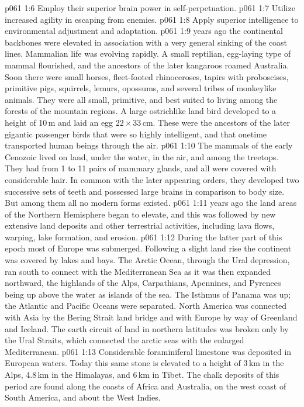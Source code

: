 \vs p061 1:6 \bibnobreakspace Employ their superior brain power in self\hyp{}perpetuation.
\vs p061 1:7 \bibnobreakspace Utilize increased agility in escaping from enemies.
\vs p061 1:8 \bibnobreakspace Apply superior intelligence to environmental adjustment and adaptation.
\vs p061 1:9 \pc {} years ago the continental backbones were elevated in association with a very general sinking of the coast lines. Mammalian life was evolving rapidly. A small reptilian, egg\hyp{}laying type of mammal flourished, and the ancestors of the later kangaroos roamed Australia. Soon there were small horses, fleet\hyp{}footed rhinoceroses, tapirs with proboscises, primitive pigs, squirrels, lemurs, opossums, and several tribes of monkeylike animals. They were all small, primitive, and best suited to living among the forests of the mountain regions. A large ostrichlike land bird developed to a height of 10\,m and laid an egg $22\times 33$\,cm. These were the ancestors of the later gigantic passenger birds that were so highly intelligent, and that onetime transported human beings through the air.
\vs p061 1:10 The mammals of the early Cenozoic lived on land, under the water, in the air, and among the treetops. They had from 1 to 11 pairs of mammary glands, and all were covered with considerable hair. In common with the later appearing orders, they developed two successive sets of teeth and possessed large brains in comparison to body size. But among them all no modern forms existed.
\vs p061 1:11 \pc {} years ago the land areas of the Northern Hemisphere began to elevate, and this was followed by new extensive land deposits and other terrestrial activities, including lava flows, warping, lake formation, and erosion.
\vs p061 1:12 During the latter part of this epoch most of Europe was submerged. Following a slight land rise the continent was covered by lakes and bays. The Arctic Ocean, through the Ural depression, ran south to connect with the Mediterranean Sea as it was then expanded northward, the highlands of the Alps, Carpathians, Apennines, and Pyrenees being up above the water as islands of the sea. The Isthmus of Panama was up; the Atlantic and Pacific Oceans were separated. North America was connected with Asia by the Bering Strait land bridge and with Europe by way of Greenland and Iceland. The earth circuit of land in northern latitudes was broken only by the Ural Straits, which connected the arctic seas with the enlarged Mediterranean.
\vs p061 1:13 Considerable foraminiferal limestone was deposited in European waters. Today this same stone is elevated to a height of 3\,km in the Alps, 4.8\,km in the Himalayas, and 6\,km in Tibet. The chalk deposits of this period are found along the coasts of Africa and Australia, on the west coast of South America, and about the West Indies.
